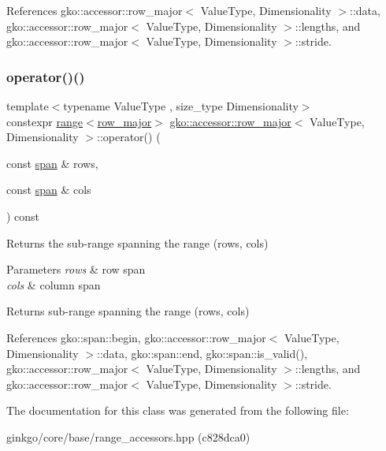 References gko\+::accessor\+::row\+\_\+major$<$ Value\+Type, Dimensionality $>$\+::data, gko\+::accessor\+::row\+\_\+major$<$ Value\+Type, Dimensionality $>$\+::lengths, and gko\+::accessor\+::row\+\_\+major$<$ Value\+Type, Dimensionality $>$\+::stride.

\mbox{\label{classgko_1_1accessor_1_1row__major_ad1a38f9d96e849ae10de733809a3494d}} 
\subsubsection{\texorpdfstring{operator()()}{operator()()}\hspace{0.1cm}{\footnotesize\ttfamily [2/2]}}
{\footnotesize\ttfamily template$<$typename Value\+Type , size\+\_\+type Dimensionality$>$ \\
constexpr \hyperlink{classgko_1_1range}{range}$<$\hyperlink{classgko_1_1accessor_1_1row__major}{row\+\_\+major}$>$ \hyperlink{classgko_1_1accessor_1_1row__major}{gko\+::accessor\+::row\+\_\+major}$<$ Value\+Type, Dimensionality $>$\+::operator() (\begin{DoxyParamCaption}\item[{const \hyperlink{structgko_1_1span}{span} \&}]{rows,  }\item[{const \hyperlink{structgko_1_1span}{span} \&}]{cols }\end{DoxyParamCaption}) const}



Returns the sub-\/range spanning the range (rows, cols) 


\begin{DoxyParams}{Parameters}
{\em rows} & row span \\
\hline
{\em cols} & column span\\
\hline
\end{DoxyParams}
\begin{DoxyReturn}{Returns}
sub-\/range spanning the range (rows, cols) 
\end{DoxyReturn}


References gko\+::span\+::begin, gko\+::accessor\+::row\+\_\+major$<$ Value\+Type, Dimensionality $>$\+::data, gko\+::span\+::end, gko\+::span\+::is\+\_\+valid(), gko\+::accessor\+::row\+\_\+major$<$ Value\+Type, Dimensionality $>$\+::lengths, and gko\+::accessor\+::row\+\_\+major$<$ Value\+Type, Dimensionality $>$\+::stride.



The documentation for this class was generated from the following file\+:\begin{DoxyCompactItemize}
\item 
ginkgo/core/base/range\+\_\+accessors.\+hpp (c828dca0)\end{DoxyCompactItemize}
